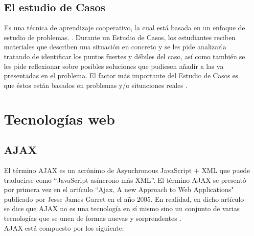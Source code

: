 \subsection{El estudio de Casos}
Es una técnica de aprendizaje cooperativo, la cual está basada en un enfoque de estudio de problemas. \cite{JCAL:JCAL119}. Durante un Estudio de Casos, los estudiantes reciben materiales que describen una situación en concreto y se les pide analizarla tratando de identificar los puntos fuertes y débiles del caso, así como también se les pide reflexionar sobre posibles soluciones que pudiesen añadir a las ya presentadas en el problema. El factor más importante del Estudio de Casos es que éstos están basados en problemas y/o situaciones reales \cite{JCAL:JCAL119}.


\section{Tecnologías web}


\subsection{AJAX}

El término AJAX es un acrónimo de Asynchronous JavaScript $+$ XML que puede traducirse como ``JavaScript asíncrono más XML''. El término AJAX se presentó por primera vez en el artículo ``Ajax, A new Approach to Web Applications" publicado por Jesse James Garret en el año 2005. En realidad, en dicho artículo se dice que AJAX no es una tecnología en sí mismo sino un conjunto de varias tecnologías que se unen de formas nuevas y sorprendentes \cite{ajax_dummies_2006}.\\

AJAX está compuesto por los siguiente:

